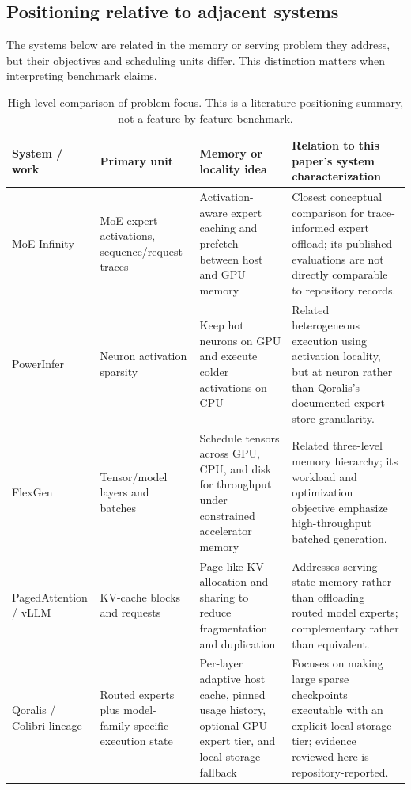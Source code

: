 \documentclass[10pt,twocolumn]{article}
\begin{document}
\subsection{Positioning relative to adjacent systems}
The systems below are related in the memory or serving problem they address, but their objectives and scheduling units differ. This distinction matters when interpreting benchmark claims.
\begin{table}[t]
\centering
\caption{High-level comparison of problem focus. This is a literature-positioning summary, not a feature-by-feature benchmark.}
\label{tab:related}
\scriptsize
\setlength{\tabcolsep}{4pt}
\renewcommand{\arraystretch}{1.12}
\begin{tabularx}{\textwidth}{@{}p{}p{}p{}X@{}}
\toprule
\textbf{System / work} & \textbf{Primary unit} & \textbf{Memory or locality idea} & \textbf{Relation to this paper's system characterization}\\
\midrule
MoE-Infinity \cite{xue2024} & MoE expert activations, sequence/request traces & Activation-aware expert caching and prefetch between host and GPU memory & Closest conceptual comparison for trace-informed expert offload; its published evaluations are not directly comparable to repository records.\\
PowerInfer \cite{song2024} & Neuron activation sparsity & Keep hot neurons on GPU and execute colder activations on CPU & Related heterogeneous execution using activation locality, but at neuron rather than Qoralis's documented expert-store granularity.\\
FlexGen \cite{sheng2023} & Tensor/model layers and batches & Schedule tensors across GPU, CPU, and disk for throughput under constrained accelerator memory & Related three-level memory hierarchy; its workload and optimization objective emphasize high-throughput batched generation.\\
PagedAttention / vLLM \cite{kwon2023} & KV-cache blocks and requests & Page-like KV allocation and sharing to reduce fragmentation and duplication & Addresses serving-state memory rather than offloading routed model experts; complementary rather than equivalent.\\
Qoralis / Colibri lineage \cite{qoralisrepo,upstreamnotice} & Routed experts plus model-family-specific execution state & Per-layer adaptive host cache, pinned usage history, optional GPU expert tier, and local-storage fallback & Focuses on making large sparse checkpoints executable with an explicit local storage tier; evidence reviewed here is repository-reported.\\
\bottomrule
\end{tabularx}
\end{table}
\end{document}
